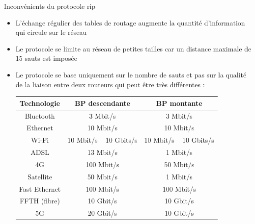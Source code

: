 \documentclass[10pt]{beamer}
\begin{document}
\begin{frame}
	\mframe{\Reseau}
	\begin{alertblock}{Inconvénients du protocole {\sc rip}}
		\begin{itemize}
			\item<1-> L'échange régulier des tables de routage augmente la quantité d'information qui circule sur le réseau
			\item<2-> Le protocole se limite au réseau de petites tailles car un distance maximale de 15 sauts est imposée
			\item<3-> Le protocole se base uniquement sur le nombre de sauts et pas sur la qualité de la liaison entre deux routeurs qui peut être très différentes :
			      {\small \begin{tabular}{|c|c|c|}
				      \hline
				      Technologie   & BP descendante         & BP montante            \\
				      \hline
				      Bluetooth     & 3 Mbit/s               & 3 Mbit/s               \\
				      Ethernet      & 10 Mbit/s              & 10 Mbit/s              \\
				      Wi-Fi         & 10 Mbit/s ~ 10 Gbits/s & 10 Mbit/s ~ 10 Gbits/s \\
				      ADSL          & 13 Mbit/s              & 1 Mbit/s               \\
				      4G            & 100 Mbit/s             & 50 Mbit/s              \\
				      Satellite     & 50 Mbit/s              & 1 Mbit/s               \\
				      Fast Ethernet & 100 Mbit/s             & 100 Mbit/s             \\
				      FFTH (fibre)  & 10 Gbit/s              & 10 Gbit/s              \\
				      5G            & 20 Gbit/s              & 10 Gbit/s              \\
				      \hline
			      \end{tabular}}
		\end{itemize}
	\end{alertblock}
\end{frame}
\end{document}

